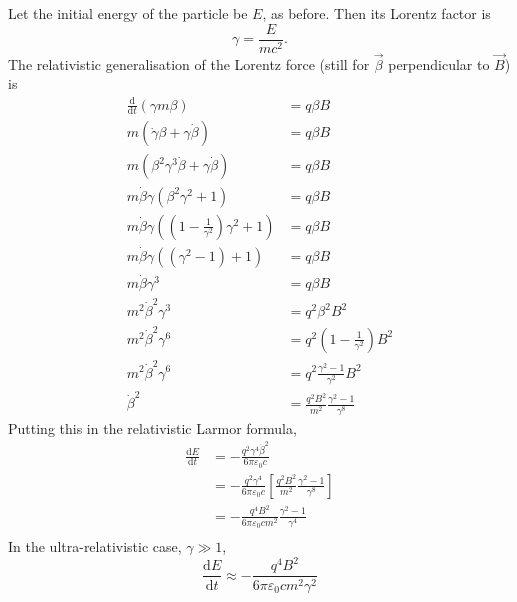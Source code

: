 \documentclass{book}
\newcommand{\deriv}[2]{\frac{\text{d}{#1}}{\text{d}{#2}}}
\begin{document}
Let the initial energy of the particle be $E$, as before.
Then its Lorentz factor is
\begin{equation}
    \gamma = \frac{E}{mc^2}.
\end{equation}
The relativistic generalisation of the Lorentz force (still for $\vec{\beta}$ perpendicular to $\vec{B}$) is
\begin{equation}
\begin{aligned}
    \deriv{}{t}(\gamma m \beta) &= q \beta B \\
    m\left(\dot{\gamma}\beta + \gamma\dot{\beta}\right) &= q \beta B \\
    m\left(\beta^2\gamma^3\dot{\beta} + \gamma\dot{\beta}\right) &= q \beta B \\
    m\dot{\beta}\gamma\left(\beta^2\gamma^2 + 1\right) &= q \beta B \\
    m\dot{\beta}\gamma\left(\left(1 - \frac{1}{\gamma^2}\right)\gamma^2 + 1\right) &= q \beta B \\
    m\dot{\beta}\gamma\left((\gamma^2 - 1) + 1\right) &= q \beta B \\
    m\dot{\beta}\gamma^3 &= q \beta B \\
    m^2\dot{\beta}^2\gamma^3 &= q^2 \beta^2 B^2 \\
    m^2\dot{\beta}^2\gamma^6 &= q^2 \left(1 - \frac{1}{\gamma^2}\right) B^2 \\
    m^2\dot{\beta}^2\gamma^6 &= q^2 \frac{\gamma^2 - 1}{\gamma^2} B^2 \\
    \dot{\beta}^2 &= \frac{q^2B^2}{m^2}\frac{\gamma^2 - 1}{\gamma^8}
\end{aligned}
\end{equation}
Putting this in the relativistic Larmor formula,
\begin{equation}
\begin{aligned}
    \deriv{E}{t}
        &= -\frac{q^2\gamma^4\dot{\beta}^2}{6\pi\varepsilon_0 c} \\
        &= -\frac{q^2\gamma^4}{6\pi\varepsilon_0 c} \left[\frac{q^2B^2}{m^2}\frac{\gamma^2 - 1}{\gamma^8} \right] \\
        &= -\frac{q^4B^2}{6\pi\varepsilon_0 c m^2}
            \frac{\gamma^2 - 1}{\gamma^4} \\
\end{aligned}
\end{equation}
In the ultra-relativistic case, $\gamma \gg 1$,
\begin{equation}
    \deriv{E}{t} \approx -\frac{q^4B^2}{6\pi\varepsilon_0 c m^2 \gamma^2}
\end{equation}
\end{document}
